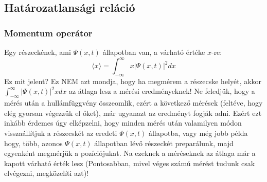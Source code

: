 \documentclass[../main.tex]{subfiles}
\begin{document}
\subsection{Határozatlansági reláció}
\subsubsection{Momentum operátor}
Egy részeckének, ami $\Psi(x,t)$ állapotban van, a várható értéke $x$-re:
\begin{equation}
    \boxed{\langle x \rangle = \int_{-\infty}^{\infty} x |\Psi(x,t)|^2 dx}
\end{equation}
Ez mit jelent? Ez NEM azt mondja, hogy ha megmérem a részecske helyét, akkor $\int_{-\infty}^{ \infty} |\Psi(x,t)|^2 x dx$ az átlaga lesz a mérési eredményeknek!
Ne feledjük, hogy a mérés után a hullámfüggvény összeomlik, ezért a következő mérések (feltéve, hogy elég gyorsan végezzük el őket), már ugyanazt az eredményt fogják adni.
Ezért ezt inkább érdemes úgy elképzelni, hogy minden mérés után valamilyen módon visszaállítjuk a részecskét az eredeti $\Psi(x,t)$ állapotba,
vagy még jobb példa hogy, több, azonos $\Psi(x, t)$ állapotban lévő részeckét preparálunk, majd egyenként megmérjük a pozíciójukat. Na ezeknek a méréseknek az átlaga már a kapott várható érték lesz
(Pontosabban, mivel véges számú mérést tudunk csak elvégezni, megközelíti azt)!
\end{document}
